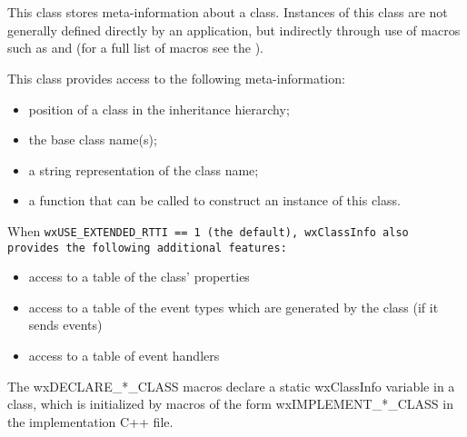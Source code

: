 

\section{}\label{wxclassinfo}

This class stores meta-information about a class. Instances of this class are
not generally defined directly by an application, but indirectly through use
of macros such as  and 
(for a full list of macros see the ).

This class provides access to the following meta-information:

\begin{itemize}\itemsep=0pt
\item position of a class in the inheritance hierarchy;
\item the base class name(s);
\item a string representation of the class name;
\item a function that can be called to construct an instance of this class.
\end{itemize}

When \tt{wxUSE_EXTENDED_RTTI == 1} (the default), wxClassInfo also provides the
following additional features:

\begin{itemize}\itemsep=0pt
\item access to a table of the class' properties
\item access to a table of the event types which are generated by the class (if it sends events)
\item access to a table of event handlers
\end{itemize}

The wxDECLARE\_*\_CLASS macros declare a static wxClassInfo variable in a class, which is initialized
by macros of the form wxIMPLEMENT\_*\_CLASS in the implementation C++ file. 

